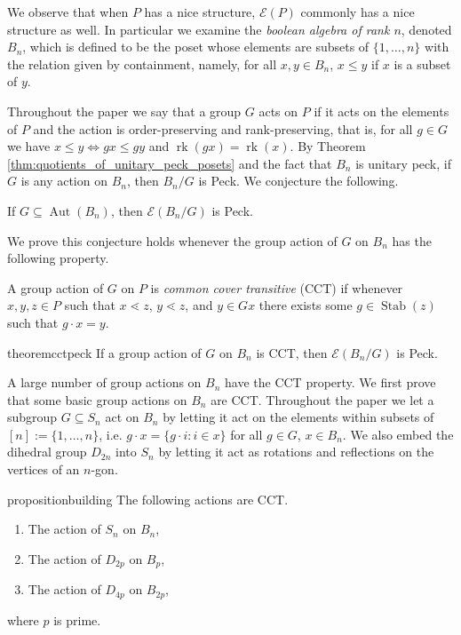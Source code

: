 \documentclass[smallextended, envcountsame, numbook]{svjour3}
\numberwithin{equation}{section}
\renewcommand{\iff}{\Leftrightarrow}
\newcommand\rk{\operatorname{rk}}
\newcommand\Stab{\operatorname{Stab}}
\newcommand\Aut{\operatorname{Aut}}
\begin{document}
We observe that when $P$ has a nice structure, $\mathcal E(P)$ commonly has a nice structure as well.  In particular we examine the \textit{boolean algebra of rank $n$}, denoted $B_n$, which is defined to be the poset whose elements are subsets of $\{1,\ldots,n\}$ with the relation given by containment, namely, for all $x,y\in B_n$, $x\le y$ if $x$ is a subset of $y$.

Throughout the paper we say that a group $G$ acts on $P$ if it acts on the elements of $P$ and the action is order-preserving and rank-preserving, that is, for all $g \in G$ we have $x \leq y \iff gx \leq gy$ and $\rk(gx) = \rk(x)$.  By Theorem \ref{thm:quotients_of_unitary_peck_posets} and the fact that $B_n$ is unitary peck, if $G$ is any action on $B_n$, then $B_n/G$ is Peck.  We conjecture the following.

\begin{conjecture}\label{conj:F_of_BnG_Peck}
If $G \subseteq \Aut(B_n)$, then $\mathcal E(B_n/G)$ is Peck.
\end{conjecture}

We prove this conjecture holds whenever the group action of $G$ on $B_n$ has the following property.

\begin{definition}
\label{defn:cover_transitive}
A group action of $G$ on $P$ is \textit{common cover transitive} (CCT) if whenever $x,y,z\in P$ such that $x\lessdot z$, $y\lessdot z$, and $y\in Gx$ there exists some $g\in \Stab(z)$ such that $g\cdot x = y$.
\end{definition}

\begin{restatable}{theorem}{cctpeck}
\label{thm:cover_transitive_implies_Peck}
If a group action of $G$ on $B_n$ is CCT, then $\mathcal E(B_n/G)$ is Peck.
\end{restatable}

A large number of group actions on $B_n$ have the CCT property.  We first prove that some basic group actions on $B_n$ are CCT.  Throughout the paper we let a subgroup $G\subseteq S_n$ act on $B_n$ by letting it act on the elements within subsets of $[n]:= \{1,\ldots, n\}$, i.e. $g\cdot x = \{g\cdot i\colon i\in x\}$  for all $g\in G$, $x\in B_n$.  We also embed the dihedral group $D_{2n}$ into $S_n$ by letting it act as rotations and reflections on the vertices of an $n$-gon.

\begin{restatable}{proposition}{building}
\label{prop:cover_transitive_building_blocks}
 The following actions are CCT.
\begin{enumerate}
\item The action of $S_n$ on $B_n$,
\item The action of $D_{2p}$ on $B_p$,
\item The action of $D_{4p}$ on $B_{2p}$,
\end{enumerate} where $p$ is prime. 
\end{restatable}
\end{document}
